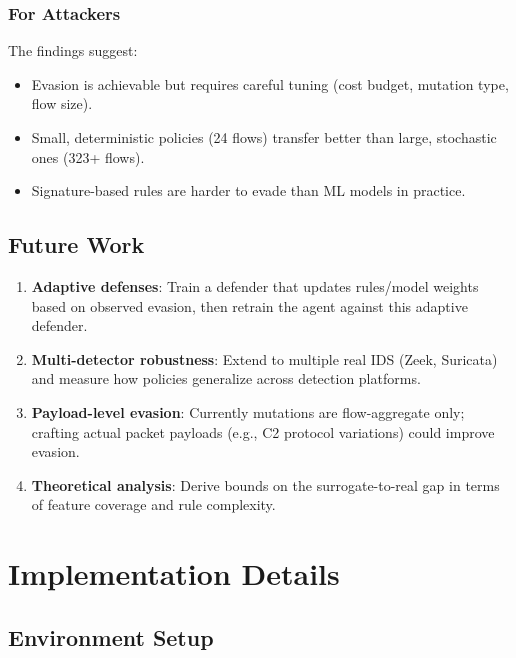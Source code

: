 \documentclass[12pt,a4paper]{report}
\begin{document}
\subsection{For Attackers}
The findings suggest:
\begin{itemize}
  \item Evasion is achievable but requires careful tuning (cost budget, mutation type, flow size).
  \item Small, deterministic policies (24 flows) transfer better than large, stochastic ones (323+ flows).
  \item Signature-based rules are harder to evade than ML models in practice.
\end{itemize}

\section{Future Work}

\begin{enumerate}
  \item \textbf{Adaptive defenses}: Train a defender that updates rules/model weights based on observed evasion, then retrain the agent against this adaptive defender.
  
  \item \textbf{Multi-detector robustness}: Extend to multiple real IDS (Zeek, Suricata) and measure how policies generalize across detection platforms.
  
  \item \textbf{Payload-level evasion}: Currently mutations are flow-aggregate only; crafting actual packet payloads (e.g., C2 protocol variations) could improve evasion.
  
  \item \textbf{Theoretical analysis}: Derive bounds on the surrogate-to-real gap in terms of feature coverage and rule complexity.
\end{enumerate}




\appendix

\chapter{Implementation Details}

\section{Environment Setup}
\end{document}
